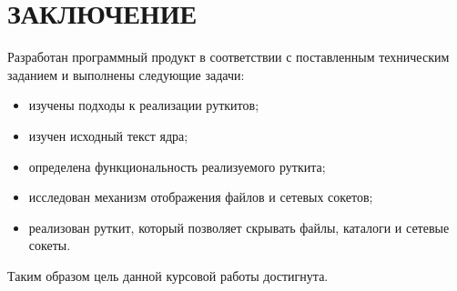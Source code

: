 \chapter*{\hfill{}ЗАКЛЮЧЕНИЕ\hfill{}}%
\label{cha:zakliuchenie}

Разработан программный продукт в соответствии с поставленным техническим заданием и выполнены следующие задачи:
\begin{itemize}
    \item
        изучены подходы к реализации руткитов;
    \item
        изучен исходный текст ядра;
    \item
        определена функциональность реализуемого руткита;
    \item
        исследован механизм отображения файлов и сетевых сокетов;
    \item
        реализован руткит, который позволяет скрывать файлы, каталоги и сетевые сокеты.
\end{itemize}

Таким образом цель данной курсовой работы достигнута.
